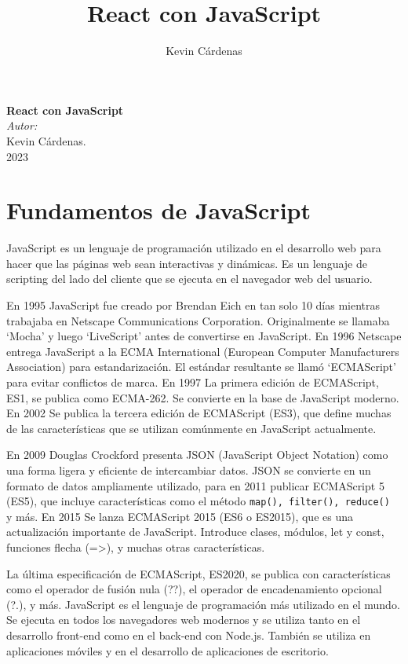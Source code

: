 \documentclass[executivepaper]{article}
\title{React con JavaScript}
\author{Kevin Cárdenas}
\begin{document}
\begin{titlepage}
    \begin{center}
        {\Huge \textbf{React con JavaScript}}
        \\[18cm]

        \large\emph{Autor:}\\
        Kevin Cárdenas.
        \\[1cm]
        {\large 2023}
    \end{center}
\end{titlepage}

\newpage
\tableofcontents
\newpage

\section{Fundamentos de JavaScript}
JavaScript es un lenguaje de programación utilizado en el desarrollo web para hacer que las páginas web sean interactivas y dinámicas. Es un lenguaje de scripting del lado del cliente que se ejecuta en el navegador web del usuario.

En 1995 JavaScript fue creado por Brendan Eich en tan solo 10 días mientras trabajaba en Netscape Communications Corporation. Originalmente se llamaba \enquote*{Mocha} y luego \enquote*{LiveScript} antes de convertirse en JavaScript. En 1996 Netscape entrega JavaScript a la ECMA International (European Computer Manufacturers Association) para estandarización. El estándar resultante se llamó \enquote*{ECMAScript} para evitar conflictos de marca. En 1997 La primera edición de ECMAScript, ES1, se publica como ECMA-262. Se convierte en la base de JavaScript moderno. En 2002 Se publica la tercera edición de ECMAScript (ES3), que define muchas de las características que se utilizan comúnmente en JavaScript actualmente.

En 2009  Douglas Crockford presenta JSON (JavaScript Object Notation) como una forma ligera y eficiente de intercambiar datos. JSON se convierte en un formato de datos ampliamente utilizado, para en 2011 publicar ECMAScript 5 (ES5), que incluye características como el método \lstinline{map(), filter(), reduce() } y más. En 2015 Se lanza ECMAScript 2015 (ES6 o ES2015), que es una actualización importante de JavaScript. Introduce clases, módulos, let y const, funciones flecha (=>), y muchas otras características. 

La última especificación de ECMAScript, ES2020, se publica con características como el operador de fusión nula (??), el operador de encadenamiento opcional (?.), y más.  JavaScript es el lenguaje de programación más utilizado en el mundo. Se ejecuta en todos los navegadores web modernos y se utiliza tanto en el desarrollo front-end como en el back-end con Node.js. También se utiliza en aplicaciones móviles y en el desarrollo de aplicaciones de escritorio.
\end{document}
